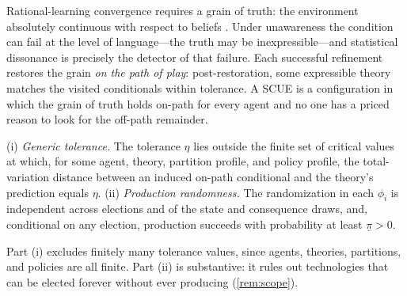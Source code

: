 \begin{remark}
\label{rem:grain}
Rational-learning convergence requires a grain of truth: the environment
absolutely continuous with respect to beliefs \citep{KalaiLehrer1993a}.
Under unawareness the condition can fail at the level of language---the
truth may be inexpressible---and statistical dissonance is precisely the
detector of that failure.  Each successful refinement restores the grain
\emph{on the path of play}: post-restoration, some expressible theory
matches the visited conditionals within tolerance.  A SCUE is a
configuration in which the grain of truth holds on-path for every agent and
no one has a priced reason to look for the off-path remainder.
\end{remark}

\begin{assumption}[Regularity]
\label{ass:regularity}
(i) \emph{Generic tolerance.}  The tolerance $\eta$ lies outside the finite
set of critical values at which, for some agent, theory, partition profile,
and policy profile, the total-variation distance between an induced on-path
conditional and the theory's prediction equals $\eta$.
(ii) \emph{Production randomness.}  The randomization in each $\phi_i$ is
independent across elections and of the state and consequence draws, and,
conditional on any election, production succeeds with probability at least
$\underline\pi>0$.
\end{assumption}

Part (i) excludes finitely many tolerance values, since agents, theories,
partitions, and policies are all finite.  Part (ii) is substantive: it rules
out technologies that can be elected forever without ever producing
(\cref{rem:scope}).

